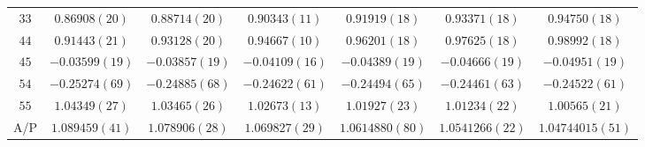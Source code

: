 \begin{table}
\begin{center}
\begin{tabular}{c|c c c c c c}
$33$ & $0.86908(20)$ & $0.88714(20)$ & $0.90343(11)$ & $0.91919(18)$ & $0.93371(18)$ & $0.94750(18)$ \\
$44$ & $0.91443(21)$ & $0.93128(20)$ & $0.94667(10)$ & $0.96201(18)$ & $0.97625(18)$ & $0.98992(18)$ \\
$45$ & $-0.03599(19)$ & $-0.03857(19)$ & $-0.04109(16)$ & $-0.04389(19)$ & $-0.04666(19)$ & $-0.04951(19)$ \\
$54$ & $-0.25274(69)$ & $-0.24885(68)$ & $-0.24622(61)$ & $-0.24494(65)$ & $-0.24461(63)$ & $-0.24522(61)$ \\
$55$ & $1.04349(27)$ & $1.03465(26)$ & $1.02673(13)$ & $1.01927(23)$ & $1.01234(22)$ & $1.00565(21)$ \\
\hline
A/P & $1.089459(41)$ & $1.078906(28)$ & $1.069827(29)$ & $1.0614880(80)$ & $1.0541266(22)$ & $1.04744015(51)$ \\
\hline
\hline
\end{tabular}
\end{center}
\end{table}